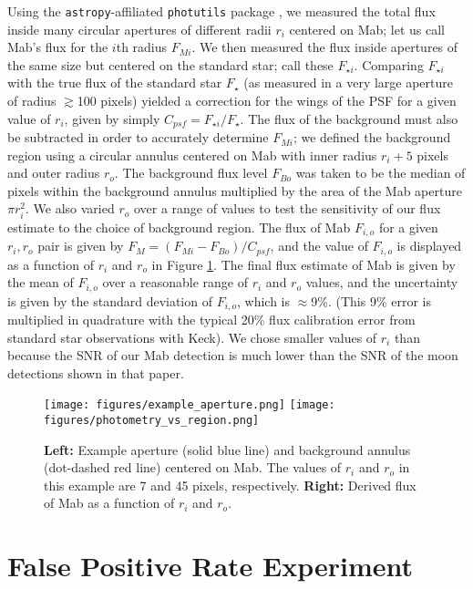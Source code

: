 \documentclass[preprint]{aastex631}
\begin{document}
Using the \texttt{astropy}-affiliated \texttt{photutils} package \citep{photutils140}, we measured the total flux inside many circular apertures of different radii $r_i$ centered on Mab; let us call Mab's flux for the $i$th radius $F_{M i}$. We then measured the flux inside apertures of the same size but centered on the standard star; call these $F_{\star i}$. Comparing $F_{\star i}$ with the true flux of the standard star $F_\star$ (as measured in a very large aperture of radius $\gtrsim$100 pixels) yielded a correction for the wings of the PSF for a given value of $r_{i}$, given by simply $C_{psf} = F_{\star i}/F_\star$. The flux of the background must also be subtracted in order to accurately determine $F_{M i}$; we defined the background region using a circular annulus centered on Mab with inner radius $r_i + 5$ pixels and outer radius $r_o$. The background flux level $F_{B o}$ was taken to be the median of pixels within the background annulus multiplied by the area of the Mab aperture $\pi r_i^2$. We also varied $r_o$ over a range of values to test the sensitivity of our flux estimate to the choice of background region. The flux of Mab $F_{i,o}$ for a given $r_i, r_o$ pair is given by $F_M = (F_{M i} - F_{B o}) / C_{psf}$, and the value of $F_{i,o}$ is displayed as a function of $r_i$ and $r_o$ in Figure \ref{fig:wing}. The final flux estimate of Mab is given by the mean of $F_{i,o}$ over a reasonable range of $r_i$ and $r_o$ values, and the uncertainty is given by the standard deviation of $F_{i,o}$, which is $\approx$9\%. (This 9\% error is multiplied in quadrature with the typical 20\% flux calibration error from standard star observations with Keck). We chose smaller values of $r_i$ than \citet{paradis23} because the SNR of our Mab detection is much lower than the SNR of the moon detections shown in that paper.

\begin{figure}
\texttt{[image: figures/example\_aperture.png]}
\texttt{[image: figures/photometry\_vs\_region.png]}
\caption{\textbf{Left:} Example aperture (solid blue line) and background annulus (dot-dashed red line) centered on Mab. The values of $r_i$ and $r_o$ in this example are 7 and 45 pixels, respectively. \textbf{Right:} Derived flux of Mab as a function of $r_i$ and $r_o$.\label{fig:wing}}
\end{figure}


\section{False Positive Rate Experiment}
\label{s:falsepositives}
\end{document}
